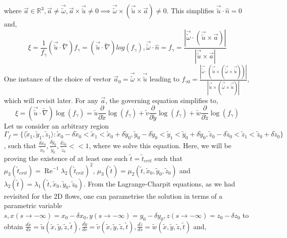 \documentclass{article}
\begin{document}
where $\vec{a} \in \mathbb{R}^3, \vec{a} \ne \vec{\tilde{\omega}}, \vec{a} \times \vec{\tilde{u}}\ne 0 \implies \vec{\tilde{\omega}}\times(\vec{\tilde{u}}\times\vec{a}) \ne 0$. This simplifies $\vec{\tilde{u}} \cdot \hat{n} = 0$ and,
\begin{equation*}
\xi = \frac{1}{f_\gamma}(\vec{\tilde{u}}\cdot\tilde{\nabla})f_\gamma = (\vec{\tilde{u}}\cdot\tilde{\nabla})log(f_\gamma), \vec{\tilde{\omega}}\cdot\hat{n} = f_\gamma = \frac{|\vec{\tilde{\omega}}\cdot(\vec{\tilde{u}}\times\vec{a})|}{|\vec{\tilde{u}}\times\vec{a}|}
\end{equation*}
One instance of the choice of vector $\vec{a}_0 = \vec{\tilde{\omega}} \times \vec{\tilde{u}}$ leading to $f_{\gamma 0} = \frac{|\vec{\tilde{\omega}}\cdot(\vec{\tilde{u}}\times(\vec{\tilde{\omega}} \times \vec{\tilde{u}}))|}{|\vec{\tilde{u}}\times(\vec{\tilde{\omega}} \times \vec{\tilde{u}})|}$, which will revisit later. For any $\vec{a}$, the governing equation simplifies to,
\begin{equation*}
\xi = (\vec{\tilde{u}}\cdot\tilde{\nabla})\operatorname{log}(f_\gamma) = \tilde{u} \frac{\partial}{\partial \tilde{x}}\operatorname{log}(f_\gamma) + \tilde{v} \frac{\partial}{\partial \tilde{y}}\operatorname{log}(f_\gamma) + \tilde{w} \frac{\partial}{\partial \tilde{z}}\operatorname{log}(f_\gamma)
\end{equation*}
Let us consider an arbitrary region $\Gamma_f = \{\langle \tilde{x}_1, \tilde{y}_1, \tilde{z}_1 \rangle: \tilde{x}_0-\delta\tilde{x}_0<\tilde{x}_1<\tilde{x}_0+\delta\tilde{y}_0, \tilde{y}_0-\delta\tilde{y}_0<\tilde{y}_1<\tilde{y}_0+\delta\tilde{y}_0, \tilde{z}_0-\delta\tilde{z}_0<\tilde{z}_1<\tilde{z}_0+\delta\tilde{z}_0\}$, such that $\frac{\delta\tilde{x}_0}{\tilde{x}_0}, \frac{\delta\tilde{y}_0}{\tilde{y}_0}, \frac{\delta\tilde{z}_0}{\tilde{z}_0} << 1$, where we solve this equation. Here, we will be proving the existence of at least one such $\tilde{t} = \tilde{t}_{crit}$ such that $\mu_3(\tilde{t}_{crit}) = \operatorname{Re}^{-1}\lambda_2(\tilde{t}_{crit})^2$, $\mu_3(\tilde{t}) = \mu_2(\tilde{t},\tilde{x}_0, \tilde{y}_0, \tilde{z}_0)$ and $\lambda_2(\tilde{t}) = \lambda_1(\tilde{t},\tilde{x}_0, \tilde{y}_0, \tilde{z}_0)$. From the Lagrange-Charpit equations, as we had revisited for the 2D flows, one can parametrise the solution in terms of a parametric variable $s, x(s\to-\infty) = x_0 - \delta x_0, y(s\to-\infty) = y_0 - \delta y_0, z(s\to-\infty) = z_0 - \delta z_0$ to obtain $\frac{d\tilde{x}}{ds} = \tilde{u}(\tilde{x},\tilde{y},\tilde{z},\tilde{t}), \frac{d\tilde{y}}{ds} = \tilde{v}(\tilde{x},\tilde{y},\tilde{z},\tilde{t}), \frac{d\tilde{z}}{ds} = \tilde{w}(\tilde{x},\tilde{y},\tilde{z},\tilde{t})$ and,
\end{document}
